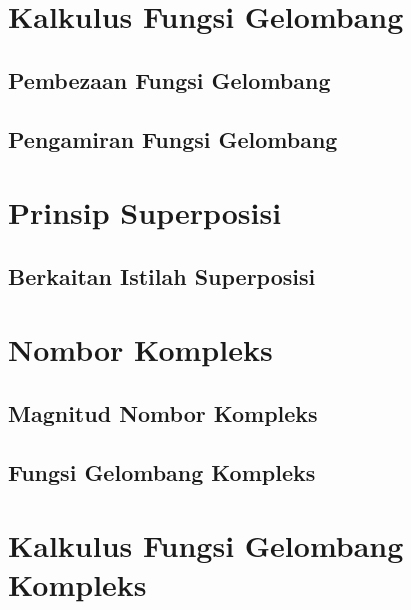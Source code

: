 \documentclass[
]{book}
\begin{document}
\hypertarget{kalkulus-fungsi-gelombang}{%
\section{Kalkulus Fungsi Gelombang}\label{kalkulus-fungsi-gelombang}}

\hypertarget{pembezaan-fungsi-gelombang}{%
\subsection{Pembezaan Fungsi
Gelombang}\label{pembezaan-fungsi-gelombang}}

\hypertarget{pengamiran-fungsi-gelombang}{%
\subsection{Pengamiran Fungsi
Gelombang}\label{pengamiran-fungsi-gelombang}}

\hypertarget{prinsip-superposisi}{%
\section{Prinsip Superposisi}\label{prinsip-superposisi}}

\hypertarget{berkaitan-istilah-superposisi}{%
\subsection{Berkaitan Istilah
Superposisi}\label{berkaitan-istilah-superposisi}}

\hypertarget{nombor-kompleks}{%
\section{Nombor Kompleks}\label{nombor-kompleks}}

\hypertarget{magnitud-nombor-kompleks}{%
\subsection{Magnitud Nombor Kompleks}\label{magnitud-nombor-kompleks}}

\hypertarget{fungsi-gelombang-kompleks}{%
\subsection{Fungsi Gelombang Kompleks}\label{fungsi-gelombang-kompleks}}

\hypertarget{kalkulus-fungsi-gelombang-kompleks}{%
\section{Kalkulus Fungsi Gelombang
Kompleks}\label{kalkulus-fungsi-gelombang-kompleks}}
\end{document}
